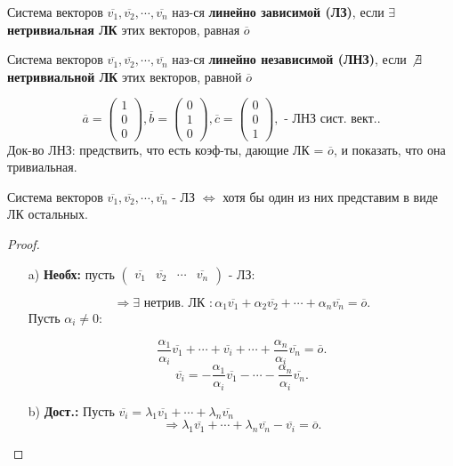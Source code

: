\begin{definition}
Система векторов $\overline{v_1}, \overline{v_2}, \cdots, \overline{v_n}$ наз-ся \textbf{линейно зависимой (ЛЗ)}, если $\exists $ \textbf{нетривиальная ЛК} этих векторов, равная $\overline{o}$
\end{definition}

\begin{definition} 
Система векторов $\overline{v_1}, \overline{v_2}, \cdots , \overline{v_n}$ наз-ся \textbf{линейно независимой (ЛНЗ)}, если \textbf{$ \not\exists $ нетривиальной ЛК} этих векторов, равной $\overline{o}$
\end{definition}
\begin{example}
\[
\overline{a} = \begin{pmatrix}1 \\ 0 \\ 0 \end{pmatrix}, \overline{b} = \begin{pmatrix}0 \\ 1 \\ 0 \end{pmatrix}, \overline{c} = \begin{pmatrix}0 \\ 0 \\ 1 \end{pmatrix}, \text{ - ЛНЗ сист. вект.}
.\] 
Док-во ЛНЗ: предствить, что есть коэф-ты, дающие ЛК = $\overline{o}$, и показать, что она тривиальная.
\end{example}
\begin{statement}
Система векторов $\overline{v_1}, \overline{v_2}, \cdots , \overline{v_n} \text{ - ЛЗ } \iff $ хотя бы один из них представим в виде ЛК остальных.
\end{statement}
\begin{proof}
\begin{itemize}
    \item [a) ] \textbf{Необх:} пусть $\begin{pmatrix} \overline{v_1} & \overline{v_2} & \cdots & \overline{v_n} \end{pmatrix} $ - ЛЗ:

        \[
        \Rightarrow \exists \text{ нетрив. ЛК } \colon \alpha_1 \overline{v_1} + \alpha_2 \overline{v_2} + \cdots + \alpha_n \overline{v_n} = \overline{o}
        .\] 
        Пусть $\alpha_i \neq 0 \colon $ 

        \[
        \frac{\alpha_1}{\alpha_i} \overline{v_1} + \cdots + \overline{v_i} + \cdots + \frac{\alpha_n}{\alpha_i}  \overline{v_n} = \overline{o}
        .\] 
    \[
    \overline{v_i} = -\frac{\alpha_1}{\alpha_i} \overline{v_1} - \cdots - \frac{\alpha_n}{\alpha_i} \overline{v_n}
    .\] 
\item [b) ] \textbf{Дост.:} Пусть $\overline{v_i} = \lambda_1 \overline{v_1} + \cdots +  \lambda_n \overline{v_n}$ 
\[
\Rightarrow \lambda_1 \overline{v_1} + \cdots + \lambda_n \overline{v_n} - \overline{v_i} = \overline{o}
.\] 
\end{itemize}
\end{proof}
